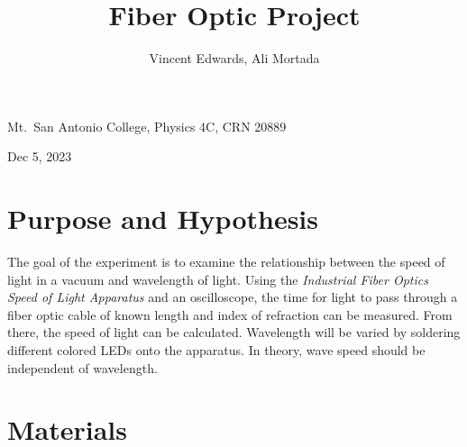 \documentclass[12pt]{iopart} %
\begin{document}
\title{Fiber Optic Project}
\author{Vincent Edwards, Ali Mortada}
\vspace{10pt}
\begin{indented}
  \item[]Mt.~San Antonio College, Physics 4C, CRN 20889
  \item[]Dec 5, 2023
\end{indented}
\newpage

\section{Purpose and Hypothesis}

The goal of the experiment is to examine the relationship between the
speed of light in a vacuum and wavelength of light.
Using the \emph{Industrial Fiber Optics Speed of Light Apparatus} and an
oscilloscope, the time for light to pass through a fiber optic cable of
known length and index of refraction can be measured.
From there, the speed of light can be calculated.
Wavelength will be varied by soldering different colored LEDs onto the apparatus.
In theory, wave speed should be independent of wavelength.

\section{Materials}
\end{document}
